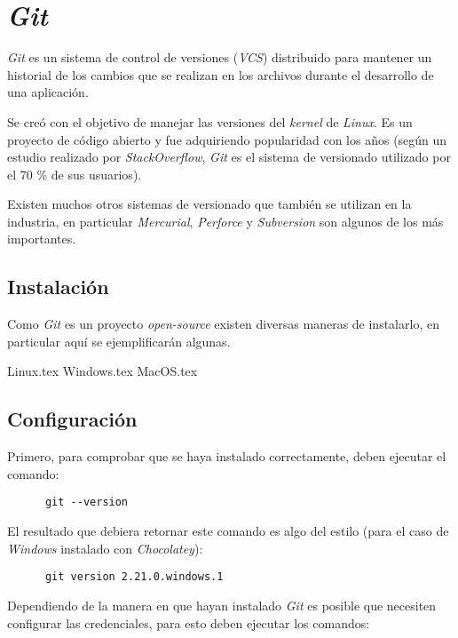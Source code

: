 \chapter{\textit{Git}}
  \textit{Git} es un sistema de control de versiones (\textit{VCS}) distribuido para 
  mantener un historial de los cambios que se realizan en los archivos durante el 
  desarrollo de una aplicación.

  Se creó con el objetivo de manejar las versiones del \textit{kernel} de \textit{Linux}.
  Es un proyecto de código abierto y fue adquiriendo popularidad con los años (según un 
  estudio realizado por \textit{StackOverflow}, \textit{Git} es el sistema de 
  versionado utilizado por el 70 \% de sus usuarios).
  
  Existen muchos otros sistemas de versionado que también se utilizan en la industria,
  en particular \textit{Mercurial}, \textit{Perforce} y \textit{Subversion} son algunos de 
  los más importantes.
  
  \section{Instalación}
    Como \textit{Git} es un proyecto \textit{open-source} existen diversas maneras de 
    instalarlo, en particular aquí se ejemplificarán algunas.

    {Linux.tex}
    {Windows.tex}
    {MacOS.tex}

  \section{Configuración}
    Primero, para comprobar que se haya instalado correctamente, deben ejecutar el 
    comando:

    \begin{verbatim}
      git --version
    \end{verbatim}

    El resultado que debiera retornar este comando es algo del estilo (para el caso de 
    \textit{Windows} instalado con \textit{Chocolatey}):

    \begin{verbatim}
      git version 2.21.0.windows.1
    \end{verbatim}

    Dependiendo de la manera en que hayan instalado \textit{Git} es posible que 
    necesiten configurar las credenciales, para esto deben ejecutar los comandos:
    
